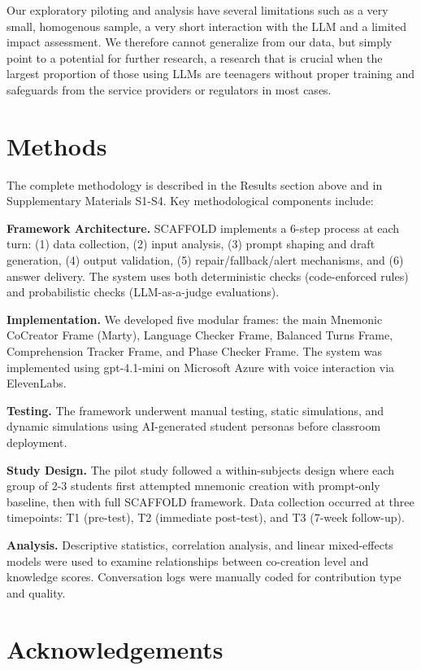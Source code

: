 \documentclass[fleqn,10pt]{wlscirep}
\begin{document}
Our exploratory piloting and analysis have several limitations such as a very small, homogenous sample, a very short interaction with the LLM and a limited impact assessment. We therefore cannot generalize from our data, but simply point to a potential for further research, a research that is crucial when the largest proportion of those using LLMs are teenagers without proper training and safeguards from the service providers or regulators in most cases.

\section*{Methods}

The complete methodology is described in the Results section above and in Supplementary Materials S1-S4. Key methodological components include:

\textbf{Framework Architecture.} SCAFFOLD implements a 6-step process at each turn: (1) data collection, (2) input analysis, (3) prompt shaping and draft generation, (4) output validation, (5) repair/fallback/alert mechanisms, and (6) answer delivery. The system uses both deterministic checks (code-enforced rules) and probabilistic checks (LLM-as-a-judge evaluations).

\textbf{Implementation.} We developed five modular frames: the main Mnemonic CoCreator Frame (Marty), Language Checker Frame, Balanced Turns Frame, Comprehension Tracker Frame, and Phase Checker Frame. The system was implemented using gpt-4.1-mini on Microsoft Azure with voice interaction via ElevenLabs.

\textbf{Testing.} The framework underwent manual testing, static simulations, and dynamic simulations using AI-generated student personas before classroom deployment.

\textbf{Study Design.} The pilot study followed a within-subjects design where each group of 2-3 students first attempted mnemonic creation with prompt-only baseline, then with full SCAFFOLD framework. Data collection occurred at three timepoints: T1 (pre-test), T2 (immediate post-test), and T3 (7-week follow-up).

\textbf{Analysis.} Descriptive statistics, correlation analysis, and linear mixed-effects models were used to examine relationships between co-creation level and knowledge scores. Conversation logs were manually coded for contribution type and quality.



\section*{Acknowledgements}
\end{document}
